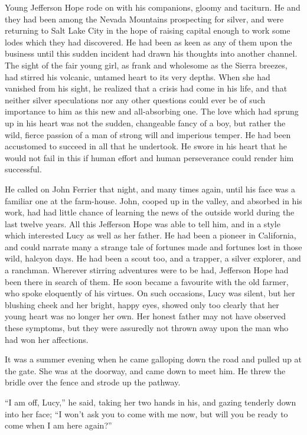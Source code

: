 \documentclass[12pt,english,oneside]{book}
\begin{document}
Young Jefferson Hope rode on with his companions, gloomy and taciturn.
He and they had been among the Nevada Mountains prospecting for silver,
and were returning to Salt Lake City in the hope of raising capital
enough to work some lodes which they had discovered. He had been as
keen as any of them upon the business until this sudden incident had
drawn his thoughts into another channel. The sight of the fair young
girl, as frank and wholesome as the Sierra breezes, had stirred his
volcanic, untamed heart to its very depths. When she had vanished
from his sight, he realized that a crisis had come in his life, and
that neither silver speculations nor any other questions could ever
be of such importance to him as this new and all-absorbing one. The
love which had sprung up in his heart was not the sudden, changeable
fancy of a boy, but rather the wild, fierce passion of a man of strong
will and imperious temper. He had been accustomed to succeed in all
that he undertook. He swore in his heart that he would not fail in
this if human effort and human perseverance could render him successful.

He called on John Ferrier that night, and many times again, until
his face was a familiar one at the farm-house. John, cooped up in
the valley, and absorbed in his work, had had little chance of learning
the news of the outside world during the last twelve years. All this
Jefferson Hope was able to tell him, and in a style which interested
Lucy as well as her father. He had been a pioneer in California, and
could narrate many a strange tale of fortunes made and fortunes lost
in those wild, halcyon days. He had been a scout too, and a trapper,
a silver explorer, and a ranchman. Wherever stirring adventures were
to be had, Jefferson Hope had been there in search of them. He soon
became a favourite with the old farmer, who spoke eloquently of his
virtues. On such occasions, Lucy was silent, but her blushing cheek
and her bright, happy eyes, showed only too clearly that her young
heart was no longer her own. Her honest father may not have observed
these symptoms, but they were assuredly not thrown away upon the man
who had won her affections.

It was a summer evening when he came galloping down the road and pulled
up at the gate. She was at the doorway, and came down to meet him.
He threw the bridle over the fence and strode up the pathway.

{}``I am off, Lucy,'' he said, taking her two hands in his, and
gazing tenderly down into her face; {}``I won't ask you to come with
me now, but will you be ready to come when I am here again?''
\end{document}

